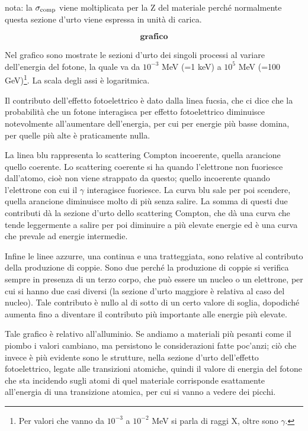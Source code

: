 nota: la $\sigma_{\rm comp}$ viene moltiplicata per la Z del materiale perché normalmente questa sezione d'urto viene espressa in unità di carica.

$$\textbf{grafico}$$

Nel grafico sono mostrate le sezioni d'urto dei singoli processi al variare dell'energia del fotone, la quale va da $10^{-3}$ MeV (=1 keV) a $10^5$ MeV (=100 GeV)\footnote{Per valori che vanno da $10^{-3}$ a $10^{-2}$ MeV si parla di raggi X, oltre sono $\gamma$.}. La scala degli assi è logaritmica.

Il contributo dell'effetto fotoelettrico è dato dalla linea fucsia, che ci dice che la probabilità che un fotone interagisca per effetto fotoelettrico diminuisce notevolmente all'aumentare dell'energia, per cui per energie più basse domina, per quelle più alte è praticamente nulla.

La linea blu rappresenta lo scattering Compton incoerente, quella arancione quello coerente. Lo scattering coerente si ha quando l'elettrone non fuoriesce dall'atomo, cioè non viene strappato da questo; quello incoerente quando l'elettrone con cui il $\gamma$ interagisce fuoriesce. La curva blu sale per poi scendere, quella arancione diminuisce molto di più senza salire. La somma di questi due contributi dà la sezione d'urto dello scattering Compton, che dà una curva che tende leggermente a salire per poi diminuire a più elevate energie ed è una curva che prevale ad energie intermedie.

Infine le linee azzurre, una continua e una tratteggiata, sono relative al contributo della produzione di coppie. Sono due perché la produzione di coppie si verifica sempre in presenza di un terzo corpo, che può essere un nucleo o un elettrone, per cui si hanno due casi diversi (la sezione d'urto maggiore è relativa al caso del nucleo). Tale contributo è nullo al di sotto di un certo valore di soglia, dopodiché aumenta fino a diventare il contributo più importante alle energie più elevate.

Tale grafico è relativo all'alluminio. Se andiamo a materiali più pesanti come il piombo i valori cambiano, ma persistono le considerazioni fatte poc'anzi; ciò che invece è più evidente sono le strutture, nella sezione d'urto dell'effetto fotoelettrico, legate alle transizioni atomiche, quindi il valore di energia del fotone che sta incidendo sugli atomi di quel materiale corrisponde esattamente all'energia di una transizione atomica, per cui si vanno a vedere dei picchi.

